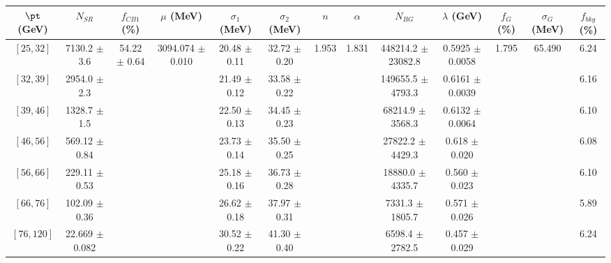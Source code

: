 \begin{tabular}{c||c|c|c|c|c|c|c|c|c|c|c||c}
$\pt$ (GeV) & $N_{SR}$ & $f_{CB1}$ (\%) & $\mu$ (MeV) & $\sigma_1$ (MeV) & $\sigma_2$ (MeV) & $n$ & $\alpha$ & $N_{BG}$ & $\lambda$ (GeV) & $f_G$ (\%) & $\sigma_G$ (MeV) & $f_{bkg}$ (\%) \\
\hline
$[25, 32]$ & 7130.2 $\pm$ 3.6 & \multirow{7}{*}{54.22 $\pm$ 0.64} & \multirow{7}{*}{3094.074 $\pm$ 0.010} & 20.48 $\pm$ 0.11 & 32.72 $\pm$ 0.20 & \multirow{7}{*}{1.953} & \multirow{7}{*}{1.831} & 448214.2 $\pm$ 23082.8 & 0.5925 $\pm$ 0.0058 & \multirow{7}{*}{1.795} & \multirow{7}{*}{65.490} & 6.24\\
$[32, 39]$ & 2954.0 $\pm$ 2.3 &  &  & 21.49 $\pm$ 0.12 & 33.58 $\pm$ 0.22 &  &  & 149655.5 $\pm$ 4793.3 & 0.6161 $\pm$ 0.0039 &  &  & 6.16\\
$[39, 46]$ & 1328.7 $\pm$ 1.5 &  &  & 22.50 $\pm$ 0.13 & 34.45 $\pm$ 0.23 &  &  & 68214.9 $\pm$ 3568.3 & 0.6132 $\pm$ 0.0064 &  &  & 6.10\\
$[46, 56]$ & 569.12 $\pm$ 0.84 &  &  & 23.73 $\pm$ 0.14 & 35.50 $\pm$ 0.25 &  &  & 27822.2 $\pm$ 4429.3 & 0.618 $\pm$ 0.020 &  &  & 6.08\\
$[56, 66]$ & 229.11 $\pm$ 0.53 &  &  & 25.18 $\pm$ 0.16 & 36.73 $\pm$ 0.28 &  &  & 18880.0 $\pm$ 4335.7 & 0.560 $\pm$ 0.023 &  &  & 6.10\\
$[66, 76]$ & 102.09 $\pm$ 0.36 &  &  & 26.62 $\pm$ 0.18 & 37.97 $\pm$ 0.31 &  &  & 7331.3 $\pm$ 1805.7 & 0.571 $\pm$ 0.026 &  &  & 5.89\\
$[76, 120]$ & 22.669 $\pm$ 0.082 &  &  & 30.52 $\pm$ 0.22 & 41.30 $\pm$ 0.40 &  &  & 6598.4 $\pm$ 2782.5 & 0.457 $\pm$ 0.029 &  &  & 6.24\\
\end{tabular}
